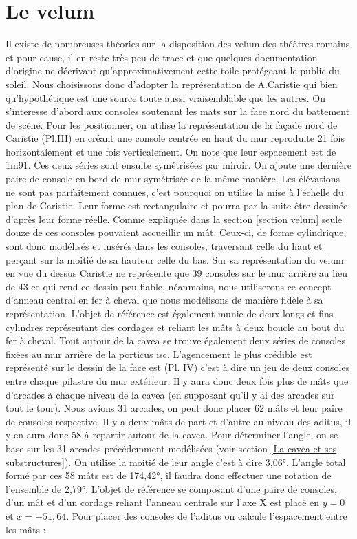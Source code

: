\section{Le velum} 
Il existe de nombreuses théories sur la disposition des velum des théâtres romains et pour cause, il en reste très peu de trace et que quelques documentation d'origine ne décrivant qu'approximativement cette toile protégeant le public du soleil. Nous choisissons donc d'adopter la représentation de A.Caristie \cite[Pl. VI]{orangePl} qui bien qu'hypothétique est une source toute aussi vraisemblable que les autres. On s'interesse d'abord aux consoles soutenant les mats sur la face nord du battement de scène. Pour les positionner, on utilise la représentation de la façade nord de Caristie (Pl.III) en créant une console centrée en haut du mur reproduite 21 fois horizontalement et une fois verticalement. On note que leur espacement est de 1m91. Ces deux séries sont ensuite symétrisées par miroir. On ajoute une dernière paire de console en bord de mur symétrisée de la même manière. Les élévations ne sont pas parfaitement connues, c'est pourquoi on utilise la mise à l'échelle du plan de Caristie. Leur forme est rectangulaire et pourra par la suite être dessinée d'après leur forme réelle. Comme expliquée dans la section \ref{section velum} seule douze de ces consoles pouvaient accueillir un mât. Ceux-ci, de forme cylindrique, sont donc modélisés et insérés dans les consoles, traversant celle du haut et perçant sur la moitié de sa hauteur celle du bas.
Sur sa représentation du velum en vue du dessus Caristie ne représente que 39 consoles sur le mur arrière au lieu de 43 ce qui rend ce dessin peu fiable, néanmoins, nous utiliserons ce concept d'anneau central en fer à cheval que nous modélisons de manière fidèle à sa représentation. L'objet de référence est également munie de deux longs et fins cylindres représentant des cordages et reliant les mâts à deux boucle au bout du fer à cheval.
Tout autour de la cavea se trouve également deux séries de consoles fixées au mur arrière de la \gls{porticus isc}. L'agencement le plus crédible est représenté sur le dessin de la face est (Pl. IV) c'est à dire un jeu de deux consoles entre chaque \gls{pilastre} du mur extérieur. Il y aura donc deux fois plus de mâts que d'arcades à chaque niveau de la cavea (en supposant qu'il y ai des arcades sur tout le tour). Nous avions 31 arcades, on peut donc placer 62 mâts et leur paire de consoles respective. Il y a deux mâts de part et d'autre au niveau des aditus, il y en aura donc 58 à repartir autour de la cavea. Pour déterminer l'angle, on se base sur les 31 arcades précédemment modélisées (voir section \ref{La cavea et ses substructures}). On utilise la moitié de leur angle c'est à dire 3,06°. L'angle total formé par ces 58 mâts est de 174,42°, il faudra donc effectuer une rotation de l'ensemble de 2,79°. L'objet de référence se composant d'une paire de consoles, d'un mât et d'un cordage reliant l'anneau centrale sur l'axe X est placé en $y=0$ et $x=-51,64$. Pour placer des consoles de l'aditus on calcule l'espacement entre les mâts :
